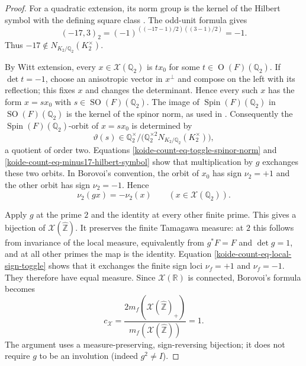 \begin{proof}
For a quadratic extension, its norm group is the kernel of the Hilbert
symbol with the defining square class
\cite[Corollary~13.4.6]{Voight_2021}.  The odd-unit formula
\cite[Equation~12.4.14]{Voight_2021} gives
\begin{equation}
 (-17,3)_2
 =(-1)^{((-17-1)/2)((3-1)/2)}=-1.
 \label{koide-count-eq-minus17-hilbert-symbol}
\end{equation}
Thus \(-17\notin N_{K_2/\mathbb Q_2}(K_2^\times)\).

By Witt extension, every \(x\in\mathscr X(\mathbb Q_2)\) is \(tx_0\) for
some \(t\in\operatorname O(F)(\mathbb Q_2)\).  If \(\det t=-1\), choose
an anisotropic vector in \(x^\perp\) and compose on the left with its
reflection; this fixes \(x\) and changes the determinant.  Hence every
such \(x\) has the form \(x=sx_0\) with
\(s\in\operatorname{SO}(F)(\mathbb Q_2)\).  The image of
\(\operatorname{Spin}(F)(\mathbb Q_2)\) in
\(\operatorname{SO}(F)(\mathbb Q_2)\) is the kernel of the spinor norm,
as used in \cite[Lemma~3.1]{Borovoi_2001}.  Consequently the
\(\operatorname{Spin}(F)(\mathbb Q_2)\)-orbit of \(x=sx_0\) is determined
by
\begin{equation}
 \vartheta(s)\in
 \mathbb Q_2^\times/
 \bigl(\mathbb Q_2^{\times2}
 N_{K_2/\mathbb Q_2}(K_2^\times)\bigr),
 \label{koide-count-eq-two-adic-orbit-quotient}
\end{equation}
a quotient of order two.  Equations
\eqref{koide-count-eq-toggle-spinor-norm} and
\eqref{koide-count-eq-minus17-hilbert-symbol} show that multiplication by
\(g\) exchanges these two orbits.  In Borovoi's convention, the orbit of
\(x_0\) has sign \(\nu_2=+1\) and the other orbit has sign
\(\nu_2=-1\).  Hence
\begin{equation}
 \nu_2(gx)=-\nu_2(x)
 \qquad(x\in\mathscr X(\mathbb Q_2)).
 \label{koide-count-eq-local-sign-toggle}
\end{equation}

Apply \(g\) at the prime \(2\) and the identity at every other finite
prime.  This gives a bijection of \(\mathscr X(\widehat{\mathbb Z})\).  It
preserves the finite Tamagawa measure: at \(2\) this follows from invariance
of the local measure, equivalently from \(g^*F=F\) and \(\det g=1\), and at
all other primes the map is the identity.  Equation
\eqref{koide-count-eq-local-sign-toggle} shows that it exchanges the finite
sign loci \(\nu_f=+1\) and \(\nu_f=-1\).  They therefore have equal
measure.  Since \(\mathscr X(\mathbb R)\) is connected, Borovoi's formula
becomes
\[
 c_{\mathscr X}
 =\frac{2m_f(\mathscr X(\widehat{\mathbb Z})_+)}
        {m_f(\mathscr X(\widehat{\mathbb Z}))}=1.
\]
The argument uses a measure-preserving, sign-reversing bijection; it does
not require \(g\) to be an involution (indeed \(g^2\neq I\)).
\end{proof}

